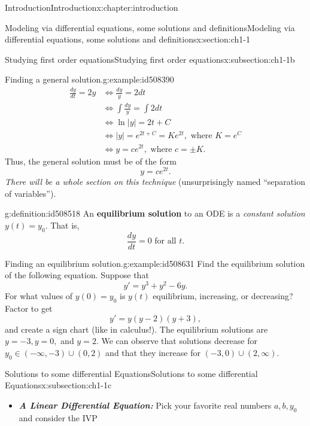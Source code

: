 \documentclass[oneside,10pt,]{book}
\newcommand{\alert}[1]{\textbf{\textit{#1}}}
\newcommand{\terminology}[1]{\textbf{#1}}
\numberwithin{equation}{section}
\numberwithin{equation}{section}
\newcommand{\amp}{&}
\begin{document}
\begin{chapterptx}{Introduction}{}{Introduction}{}{}{x:chapter:introduction}
\begin{sectionptx}{Modeling via differential equations, some solutions and definitions}{}{Modeling via differential equations, some solutions and definitions}{}{}{x:section:ch1-1}
\begin{subsectionptx}{Studying first order equations}{}{Studying first order equations}{}{}{x:subsection:ch1-1b}
\begin{example}{Finding a general solution.}{g:example:id508390}
\begin{align*}
\frac{dy}{dt}=2y \amp \iff\frac{dy}{y}=2dt\\
\amp \iff\int\frac{dy}{y}=\int2dt\\
\amp \iff\ln\left|y\right|=2t+C\\
\amp \iff\left|y\right|=e^{2t+C}=Ke^{2t},\text{ where }K=e^{C}\\
\amp \iff y=ce^{2t},\text{ where }c=\pm K.
\end{align*}
Thus, the general solution must be of the form%
\begin{equation*}
y = ce^{2t}.
\end{equation*}
\emph{There will be a whole section on this technique} (unsurprisingly named ``separation of variables'').\end{example}
\begin{definition}{}{g:definition:id508518}%
An \terminology{equilibrium solution} to an ODE is a \emph{constant solution}\(y(t) = y_0\). That is,%
\begin{equation*}
\frac{dy}{dt} = 0 \text{ for all } t.
\end{equation*}
\end{definition}
\begin{example}{Finding an equilibrium solution.}{g:example:id508631}%
 Find the equilibrium solution of the following equation. Suppose that%
\begin{equation*}
y' = y^3 + y^2 - 6y.
\end{equation*}
For what values of \(y(0) = y_0\) is \(y(t)\) equilibrium, increasing, or decreasing? Factor to get%
\begin{equation*}
y' = y(y-2)(y+3),
\end{equation*}
and create a sign chart (like in calculus!). The equilibrium solutions are \(y = -3, y=0,\) and \(y=2\). We can observe that solutions decrease for \(y_0 \in (-\infty, -3)\cup(0,2)\) and that they increase for \((-3,0)\cup(2,\infty)\).\end{example}
\end{subsectionptx}
%
%
\typeout{************************************************}
\typeout{************************************************}
%
\begin{subsectionptx}{Solutions to some differential Equations}{}{Solutions to some differential Equations}{}{}{x:subsection:ch1-1c}
%
\begin{itemize}[label=\textbullet]
\item{}\alert{A Linear Differential Equation:} Pick your favorite real numbers \(a,b,y_{0}\) and consider the IVP%

\end{itemize}
\end{subsectionptx}
\end{sectionptx}
\end{chapterptx}
\end{document}

